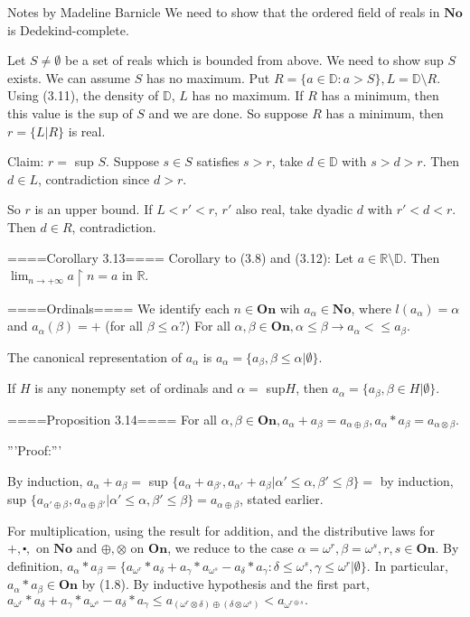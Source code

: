 Notes by Madeline Barnicle
We need to show that the ordered field of reals in $\mathbf{No}$ is Dedekind-complete.

Let $S \neq \emptyset$ be a set of reals which is bounded from above. We need to show sup $S$ exists. We can assume $S$ has no maximum. Put $R=\{a \in \mathbb{D}: a>S\}, L=\mathbb{D} \setminus R$. Using (3.11), the density of $\mathbb{D}$, $L$ has no maximum. If $R$ has a minimum, then this value is the sup of $S$ and we are done. So suppose $R$ has a minimum, then $r=\{L|R\}$ is real.

Claim: $r=$ sup $S$. Suppose $s \in S$ satisfies $s>r$, take $d \in \mathbb{D}$ with $s>d>r$. Then $d \in L$, contradiction since $d>r$.

So $r$ is an upper bound. If $L<r'<r$, $r'$ also real, take dyadic $d$ with $r'<d<r$. Then $d \in R$, contradiction.

====Corollary 3.13====
Corollary to (3.8) and (3.12): Let $a \in \mathbb{R} \setminus \mathbb{D}$. Then $\lim_{n \to +\infty} a \restriction n =a$ in $\mathbb{R}$.

====Ordinals====
We identify each $n \in \mathbf{On}$ wih $a_\alpha \in \mathbf{No}$, where $l(a_\alpha)=\alpha$ and $a_{\alpha}(\beta)=+$ (for all $\beta \leq \alpha$?) For all $\alpha, \beta \in \mathbf{On}, \alpha \leq \beta \rightarrow a_\alpha <\leq a_\beta$.

The canonical representation of $a_\alpha$ is $a_\alpha = \{a_{\beta}, \beta \leq \alpha | \emptyset \}$.

If $H$ is any nonempty set of ordinals and $\alpha =$ sup$ H$, then $a_\alpha = \{a_{\beta}, \beta \in H | \emptyset \}$.

====Proposition 3.14====
For all $\alpha, \beta \in \mathbf{On}, a_\alpha + a_\beta = a_{\alpha \oplus \beta}, a_\alpha * a_\beta = a_{\alpha \otimes \beta}$.


'''Proof:'''

By induction, $a_\alpha + a_\beta =$ sup $\{a_\alpha + a_{\beta'}, a_{\alpha'} + a_\beta | \alpha' \leq \alpha, \beta' \leq \beta \}  =$ by induction, sup $\{a_{\alpha' \oplus \beta}, a_{\alpha \oplus \beta'} | \alpha' \leq \alpha, \beta' \leq \beta \} = a_{\alpha \oplus \beta}$, stated earlier.

For multiplication, using the result for addition, and the distributive laws for $+, \centerdot,$ on $\mathbf{No}$ and $\oplus, \otimes$ on $\mathbf{On}$, we reduce to the case $\alpha = \omega^r, \beta= \omega^s, r, s \in \mathbf{On}$. By definition, $a_\alpha * a_\beta = \{a_{\omega^r} * a_\delta + a_{\gamma}*a_{\omega^s} - a_{\delta}*a_{\gamma} : \delta \leq \omega^s, \gamma \leq \omega^r | \emptyset \}.$ In particular, $a_\alpha * a_\beta \in \mathbf{On}$ by (1.8). By inductive hypothesis and the first part, $a_{\omega^r} * a_\delta + a_{\gamma}*a_{\omega^s} - a_{\delta}*a_{\gamma} \leq a_{(\omega^r \otimes \delta) \oplus (\delta \otimes \omega^s)} < a_{\omega^{r \oplus s}}.$


